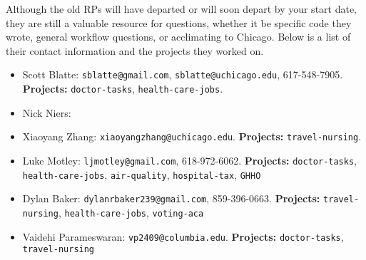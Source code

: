 Although the old RPs will have departed or will soon depart by your start date, 
they are still a valuable resource for questions, 
whether it be specific code they wrote, general workflow questions, or acclimating to Chicago.
Below is a list of their contact information and the projects they worked on. 
\begin{itemize}
    \item Scott Blatte: \texttt{sblatte@gmail.com}, \texttt{sblatte@uchicago.edu}, 617-548-7905. \textbf{Projects:} \texttt{doctor-tasks}, \texttt{health-care-jobs}.
    \item Nick Niers:
    \item Xiaoyang Zhang: \texttt{xiaoyangzhang@uchicago.edu}.  \textbf{Projects:} \texttt{travel-nursing}.
    \item Luke Motley: \texttt{ljmotley@gmail.com}, 618-972-6062. \textbf{Projects:} \texttt{doctor-tasks}, \texttt{health-care-jobs}, \texttt{air-quality}, \texttt{hospital-tax}, \texttt{GHHO}
    \item Dylan Baker: \texttt{dylanrbaker239@gmail.com}, 859-396-0663. \textbf{Projects:} \texttt{travel-nursing}, \texttt{health-care-jobs}, \texttt{voting-aca}
    \item Vaidehi Parameswaran: \texttt{vp2409@columbia.edu}. \textbf{Projects:} \texttt{doctor-tasks}, \texttt{travel-nursing}
\end{itemize}




